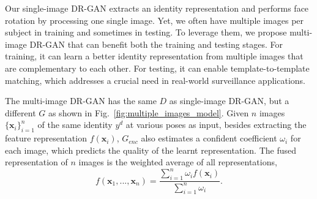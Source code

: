 \documentclass[10pt,journal,compsoc]{IEEEtran}
\begin{document}

Our single-image DR-GAN extracts an identity representation and performs face rotation by processing one single image. 
Yet, we often have multiple images per subject in training and sometimes in testing.
To leverage them, we propose multi-image DR-GAN that can benefit both the training and testing stages. 
For training, it can learn a better identity representation from multiple images that are complementary to each other. 
For testing, it can enable template-to-template matching, which addresses a crucial need in real-world surveillance applications. 

The multi-image DR-GAN has the same $D$ as single-image DR-GAN, but a different $G$ as shown in Fig.~\ref{fig:multiple_images_model}. 
Given $n$ images $\{\mathbf{x}_i\}_{i=1}^n$ of the same identity $y^d$ at various poses as input, besides extracting the feature representation $f(\mathbf{x}_i)$, $G_{enc}$ also estimates a confident coefficient $\omega_i$ for each image, which predicts the quality of the learnt representation. 
The fused representation of $n$ images is the weighted average of all representations, 
\eqnvspace\begin{equation}
f(\mathbf{x}_1, ..., \mathbf{x}_n) = \frac{\sum_{i=1}^n \omega_i f(\mathbf{x}_i)}{\sum_{i=1}^n \omega_i}. 
\label{eqn:fuse}
\end{equation}
\end{document}

